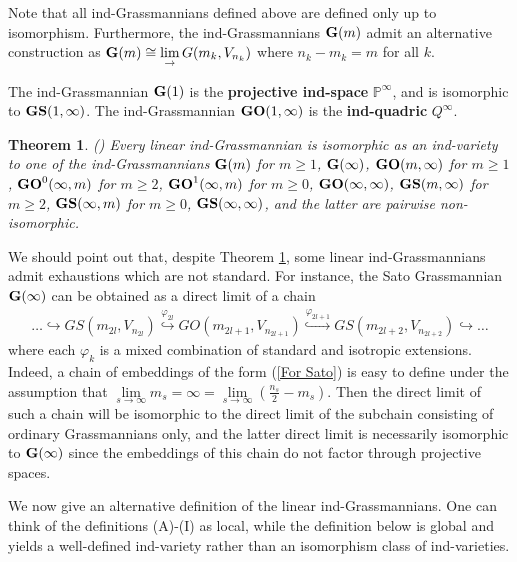 \documentclass[12pt]{amsart}
\def\PP {{\mathbb P}}     %
\newtheorem{theorem}{Theorem}[section]
\begin{document}
Note that all ind-Grassmannians defined above are defined only up to isomorphism. Furthermore, the ind-Grassmannians ${\bf G}(m)$ admit an alternative construction as ${\bf G}(m)\cong \lim\limits_\to G(m_k,V_{n_k})$ where $n_k-m_k=m$ for all $k$.

The ind-Grassmannian ${\bf G}(1)$ is the {\bf projective ind-space} $\PP^\infty$, and is isomorphic to ${\bf GS}(1,\infty)$. The ind-Grassmannian ${\bf GO}(1,\infty)$ is the {\bf ind-quadric} $Q^\infty$.

\begin{theorem}\label{Theo Standard Ind Grass} {\rm (\cite[Theorem 2]{Penkov-Tikhomirov-Lin-ind-Grass})} %
Every linear ind-Grassmannian is isomorphic as an ind-variety to one of the ind-Grassmannians ${\bf G}(m)$ for $m\geq 1$, ${\bf G}(\infty)$, ${\bf GO}(m,\infty)$ for $m\geq 1$, ${\bf GO}^0(\infty,m)$ for $m\geq 2$, ${\bf GO}^1(\infty,m)$ for $m\geq 0$, ${\bf GO}(\infty,\infty)$, ${\bf GS}(m,\infty)$ for $m\geq 2$, ${\bf GS}(\infty,m)$ for $m\geq 0$, ${\bf GS}(\infty,\infty)$, and the latter are pairwise non-isomorphic.
\end{theorem}


We should point out that, despite Theorem \ref{Theo Standard Ind Grass}, some linear ind-Grassmannians admit exhaustions which are not standard. For instance, the Sato Grassmannian ${\bf G}(\infty)$ can be obtained as a direct limit of a chain
\begin{gather}\label{For Sato}
\dots \hookrightarrow GS(m_{2l},V_{n_{2l}}) \stackrel{\varphi_{2l}}{\hookrightarrow} GO(m_{2l+1},V_{n_{2l+1}}) \stackrel{\varphi_{2l+1}}{\hookrightarrow} GS(m_{2l+2},V_{n_{2l+2}}) \hookrightarrow \dots
\end{gather}
where each $\varphi_k$ is a mixed combination of standard and isotropic extensions. Indeed, a chain of embeddings of the form (\ref{For Sato}) is easy to define under the assumption that $\lim\limits_{s\to\infty} m_s = \infty =\lim\limits_{s\to\infty} (\frac{n_s}{2}-m_s)$. Then the direct limit of such a chain will be isomorphic to the direct limit of the subchain consisting of ordinary Grassmannians only, and the latter direct limit is necessarily isomorphic to ${\bf G}(\infty)$ since the embeddings of this chain do not factor through projective spaces. 


We now give an alternative definition of the linear ind-Grassmannians. One can think of the definitions (A)-(I) as local, while the definition below is global and yields a well-defined ind-variety rather than an isomorphism class of ind-varieties.
\end{document}
